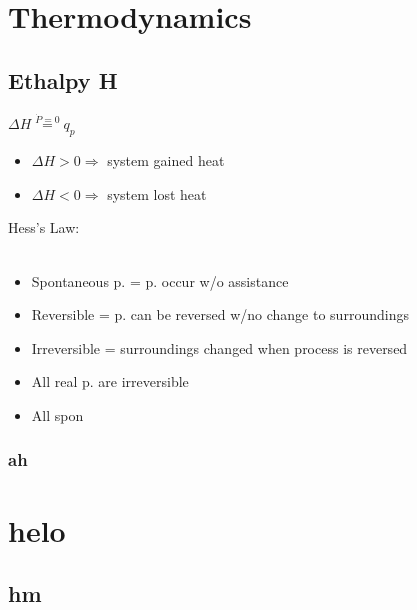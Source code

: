 \documentclass[ wastespaceontitle, english]{cheat_sheet_template}
\begin{document}
\section{Thermodynamics}
    \subsection{Ethalpy H}
    $ \Delta H  \stackrel{\dot{P}=0}{=}  q_p $
    \begin{itemize}
        \item $\Delta H > 0 \Rightarrow$ system gained heat
        \item $\Delta H < 0 \Rightarrow$ system lost heat
    \end{itemize}
    Hess's Law: \\
     \\
    \begin{itemize}
        \item Spontaneous p. = p. occur w/o assistance
        \item Reversible = p. can be reversed w/no change to surroundings
        \item Irreversible = surroundings changed when process is reversed
    \end{itemize}
    \begin{itemize}
        \item All real p. are irreversible
        \item All spon
    \end{itemize}
        \subsubsection{ah}
\lipsum
\section{helo}
\subsection{hm}
\lipsum
\end{document}
